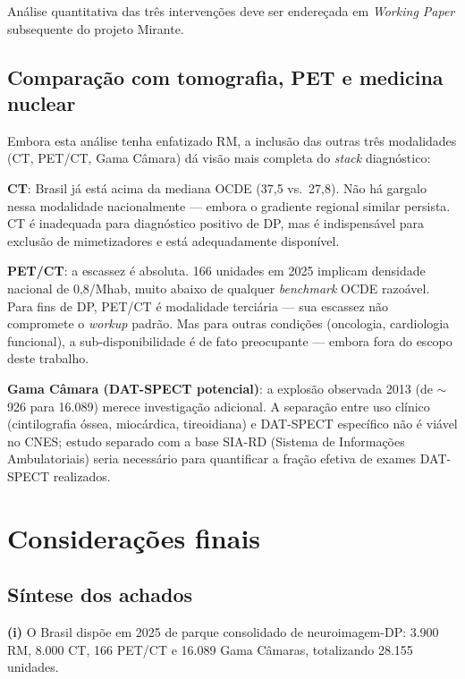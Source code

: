 \documentclass[12pt,a4paper,oneside]{article}
\begin{document}
Análise quantitativa das três intervenções deve ser endereçada em
\textit{Working Paper} subsequente do projeto Mirante.

\subsection{Comparação com tomografia, PET e medicina nuclear}

Embora esta análise tenha enfatizado RM, a inclusão das outras três
modalidades (CT, PET/CT, Gama Câmara) dá visão mais completa do
\textit{stack} diagnóstico:

\textbf{CT}: Brasil já está acima da mediana OCDE (37,5 vs.\ 27,8).
Não há gargalo nessa modalidade nacionalmente — embora o gradiente
regional similar persista. CT é inadequada para diagnóstico
positivo de DP, mas é indispensável para exclusão de mimetizadores e
está adequadamente disponível.

\textbf{PET/CT}: a escassez é absoluta. 166 unidades em 2025
implicam densidade nacional de 0,8/Mhab, muito abaixo de qualquer
\textit{benchmark} OCDE razoável. Para fins de DP, PET/CT é
modalidade terciária — sua escassez não compromete o
\textit{workup} padrão. Mas para outras condições (oncologia,
cardiologia funcional), a sub-disponibilidade é de fato preocupante
— embora fora do escopo deste trabalho.

\textbf{Gama Câmara (DAT-SPECT potencial)}: a explosão observada
2013 (de $\sim$926 para 16.089) merece investigação
adicional. A separação entre uso clínico (cintilografia óssea,
miocárdica, tireoidiana) e DAT-SPECT específico não é viável no
CNES; estudo separado com a base SIA-RD (Sistema de Informações
Ambulatoriais) seria necessário para quantificar a fração efetiva
de exames DAT-SPECT realizados.

\section{Considerações finais}\label{sec:conclusao}

\subsection{Síntese dos achados}

\textbf{(i)} O Brasil dispõe em 2025 de parque consolidado de
neuroimagem-DP: 3.900 RM, 8.000 CT, 166 PET/CT e 16.089 Gama
Câmaras, totalizando 28.155 unidades.
\end{document}
